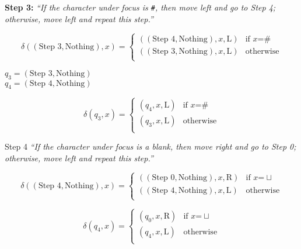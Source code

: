 \documentclass[
  ignorenonframetext,
]{beamer}
\begin{document}
\begin{frame}[fragile]
\protect\hypertarget{step-3}{}

\textbf{Step 3:}
\emph{``If the character under focus is \texttt{\#}, then move left and go to Step 4; otherwise, move left and repeat this step.''}\pause

\[\delta((\text{Step 3},\text{Nothing}), x) = \begin{cases}
((\text{Step 4},\text{Nothing}),x, \mathrm{L}) & \text{if } x \text{=} \#\\
((\text{Step 3},\text{Nothing}),x, \mathrm{L}) & \text{otherwise}\\
\end{cases}
\]\pause


$q_3=(\text{Step 3},\text{Nothing})$\\
$q_4=(\text{Step 4},\text{Nothing})$\pause

\[\delta(q_3, x) = \begin{cases}
(q_4 ,x, \mathrm{L}) & \text{if } x \text{=} \#\\
(q_3,x, \mathrm{L}) & \text{otherwise}\\
\end{cases}
\]

\end{frame}

\begin{frame}{Step 4}
\protect\hypertarget{step-4}{}
\emph{``If the character under focus is a blank, then move right and go to Step 0; otherwise, move left and repeat this step.''}\pause

\[\delta((\text{Step 4},\text{Nothing}), x) = \begin{cases}
((\text{Step 0}, \text{Nothing}),x, \mathrm{R}) & \text{if } x \text{=} \sqcup \\
((\text{Step 4},\text{Nothing}),x, \mathrm{L}) & \text{otherwise}\\
\end{cases}
\]\pause


\[\delta(q_4, x) = \begin{cases}
(q_0 ,x, \mathrm{R}) & \text{if } x \text{=} \sqcup \\
(q_4,x, \mathrm{L}) & \text{otherwise}\\
\end{cases}
\]

\end{frame}
\end{document}
